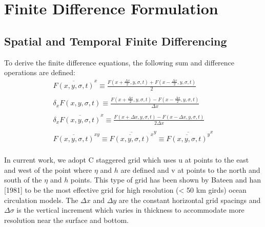 \documentclass[oribibl]{llncs}
\begin{document}
\section{Finite Difference Formulation}

\subsection{Spatial and Temporal Finite Differencing}

To derive the finite difference equations, the following sum and difference operations are defined:
\begin{eqnarray}
\overline{F(x,y,\sigma,t)}^x \equiv \frac{F(x+\frac{\Delta x}{2}, y, \sigma, t) + F(x-\frac{\Delta x}{2}, y, \sigma, t)}{2} \\
\nonumber \\
\delta_x {F(x,y,\sigma,t)} \equiv \frac{F(x+\frac{\Delta x}{2}, y, \sigma, t) - F(x-\frac{\Delta x}{2}, y, \sigma, t)}{\Delta x} \\
\nonumber \\
\delta_x \overline{F(x,y,\sigma,t)}^x \equiv \frac{F(x+\Delta x, y, \sigma, t) - F(x-\Delta x, y, \sigma, t)}{2\Delta x} \\
\nonumber \\
\overline{F(x,y,\sigma,t)}^{xy} \equiv \overline{\overline{F(x,y,\sigma,t)}^x}^y \equiv \overline{\overline{F(x,y,\sigma,t)}^y}^x\\
\end{eqnarray}

In current work, we adopt C staggered grid which uses u at points to the east and west of the point where $\eta$ and $h$ are defined and v at points to the north and south of the $\eta$ and $h$ points. This type of grid has been shown by Bateen and han [1981] to be the most effective grid for high resolution (< 50 km girds) ocean circulation models. The $\Delta x$ and $\Delta y$ are the constant horizontal grid spacings and $\Delta \sigma$ is the vertical increment which varies in thickness to accommodate more resolution near the surface and bottom.
 
\end{document}
